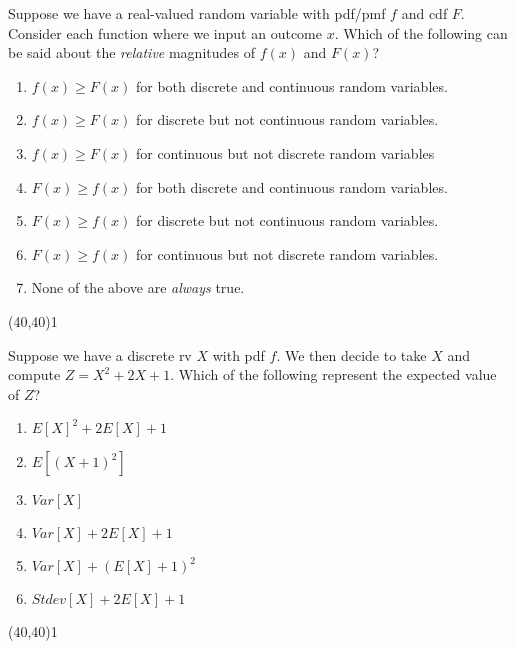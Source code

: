 \documentclass[addpoints]{exam}
\def\solutions{0}
\begin{document}
{\begin{questions}
\question[3] Suppose we have a real-valued random variable with pdf/pmf $f$ and cdf $F$.  Consider each function where we input an outcome $x$.  Which of the following can be said about the \textit{relative} magnitudes of $f(x)$ and $F(x)$?
\vspace{2mm}

\begin{minipage}[b]{.85\textwidth}
	\begin{enumerate}[label=\Alph*.]
		\item $f(x)\geq F(x)$ for both discrete and continuous random variables.
		\item $f(x)\geq F(x)$ for discrete but not continuous random variables.
		\item $f(x)\geq F(x)$ for continuous but not discrete random variables	
		\item $F(x)\geq f(x)$ for both discrete and continuous random variables.
		\item $F(x)\geq f(x)$ for discrete but not continuous random variables.
		\item $F(x)\geq f(x)$ for continuous but not discrete random variables.	
		\item None of the above are \textit{always} true.
	\end{enumerate}
\end{minipage}
\begin{minipage}[b]{.1\textwidth}
	\vspace{\fill}\framebox(40,40){\if\solutions1 \fi}
\end{minipage}
\vspace{3mm}
\question[3] Suppose we have a discrete rv $X$ with pdf $f$.  We then decide to take $X$ and compute $Z=X^2+2X+1$.  Which of the following represent the expected value of $Z$?

\begin{minipage}[b]{.85\textwidth}
	\begin{enumerate}[label=\Alph*.]
		\item $E[X]^2+2E[X]+1$
		\item $E[(X+1)^2]$
		\item $Var[X]$
		\item $Var[X]+2E[X]+1$
		\item $Var[X]+(E[X]+1)^2$
		\item $Stdev[X]+2E[X]+1$
	\end{enumerate}
\end{minipage}
\begin{minipage}[b]{.1\textwidth}
	\vspace{\fill}\framebox(40,40){\if\solutions1 \fi}
\end{minipage}



\end{questions}}
\end{document}
